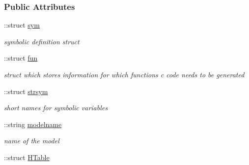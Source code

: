 \subsubsection*{Public Attributes}
\begin{DoxyCompactItemize}
\item 
\hypertarget{classamimodel_a3c48fff3d28406486a4f1b5e18da7ca6}{}\+::struct \hyperlink{classamimodel_a3c48fff3d28406486a4f1b5e18da7ca6}{sym}\label{classamimodel_a3c48fff3d28406486a4f1b5e18da7ca6}

\begin{DoxyCompactList}\small\item\em symbolic definition struct \end{DoxyCompactList}\item 
\hypertarget{classamimodel_a743fa290dbc0a67a3843d5ab0426e9b4}{}\+::struct \hyperlink{classamimodel_a743fa290dbc0a67a3843d5ab0426e9b4}{fun}\label{classamimodel_a743fa290dbc0a67a3843d5ab0426e9b4}

\begin{DoxyCompactList}\small\item\em struct which stores information for which functions c code needs to be generated \end{DoxyCompactList}\item 
\hypertarget{classamimodel_a4814315a739f43461b003c1c1ef6f550}{}\+::struct \hyperlink{classamimodel_a4814315a739f43461b003c1c1ef6f550}{strsym}\label{classamimodel_a4814315a739f43461b003c1c1ef6f550}

\begin{DoxyCompactList}\small\item\em short names for symbolic variables \end{DoxyCompactList}\item 
\hypertarget{classamimodel_a71bca9c21a6de42d8079ade31cb61044}{}\+::string \hyperlink{classamimodel_a71bca9c21a6de42d8079ade31cb61044}{modelname}\label{classamimodel_a71bca9c21a6de42d8079ade31cb61044}

\begin{DoxyCompactList}\small\item\em name of the model \end{DoxyCompactList}\item 
\hypertarget{classamimodel_aafe6335df413dd688a2f44efba012cf1}{}\+::struct \hyperlink{classamimodel_aafe6335df413dd688a2f44efba012cf1}{H\+Table}\label{classamimodel_aafe6335df413dd688a2f44efba012cf1}


\end{DoxyCompactItemize}

